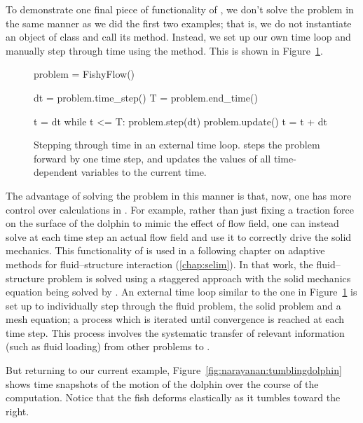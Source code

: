To demonstrate one final piece of functionality of \twist, we don't
solve the problem in the same manner as we did the first two examples;
that is, we do not instantiate an object of class  and
call its  method. Instead, we set up our own time loop
and manually step through time using the  method. This is
shown in Figure~\ref{code:narayanan:manualstep}.

\begin{figure}
\bwfig
\begin{python}
problem = FishyFlow()

dt = problem.time_step()
T = problem.end_time()

t = dt
while t <= T:
    problem.step(dt)
    problem.update()
    t = t + dt
\end{python}
\caption{Stepping through time in an external time loop. 
  steps the problem forward by one time step, and 
  updates the values of all time-dependent variables to the current time.}
\label{code:narayanan:manualstep}
\end{figure}

The advantage of solving the problem in this manner is that, now, one
has more control over calculations in \twist{}. For example, rather
than just fixing a traction force on the surface of the dolphin to
mimic the effect of flow field, one can instead solve at each time
step an actual flow field and use it to correctly drive the solid
mechanics. This functionality of \twist{} is used in a following
chapter on adaptive methods for fluid--structure interaction
(\ref{chap:selim}). In that work, the fluid--structure problem is
solved using a staggered approach with the solid mechanics equation
being solved by \twist. An external time loop similar to the one in
Figure~\ref{code:narayanan:manualstep} is set up to individually step
through the fluid problem, the solid problem and a mesh equation; a
process which is iterated until convergence is reached at each time
step. This process involves the systematic transfer of relevant
information (such as fluid loading) from other problems to \twist.

But returning to our current example,
Figure~\ref{fig:narayanan:tumblingdolphin} shows time snapshots of the
motion of the dolphin over the course of the computation. Notice that
the fish deforms elastically as it tumbles toward the right.

